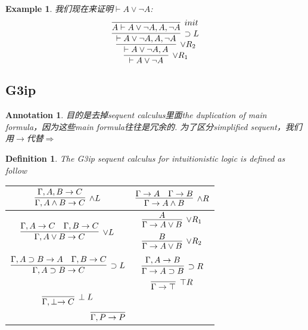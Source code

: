 \documentclass{article}
\theoremstyle{plain}
\newtheorem{example}[theorem]{Example}
\newtheorem{definition}[theorem]{Definition}
\newtheorem{annotation}[theorem]{Annotation}
\theoremstyle{nonumberplain}
\begin{document}
\begin{example}
\rm 我们现在来证明$\vdash A \vee \neg A$:
\[
	\infer[\vee R_1]{\vdash A \vee \neg A}{\infer[\vee R_2]{\vdash A \vee \neg A, A}{\infer[\supset L]{\vdash A \vee \neg A, A, \neg A}{\infer[init]{A \vdash A \vee \neg A, A, \neg A}{}}}}
\]
\end{example}

\newpage
\subsection{G3ip}

\begin{annotation}
\rm 目的是去掉sequent calculus里面the duplication of main formula，因为这些main formula往往是冗余的. 为了区分simplified sequent，我们用$\to$代替$\Rightarrow$
\end{annotation}

\begin{definition}
\rm \cite{15-317-rsc}The G3ip sequent calculus for intuitionistic logic is defined as follow
\begin{center}
\begin{tabular}{|c|c|}
\hline $\infer[\wedge L]{\Gamma, A \wedge B \to C}{\Gamma, A, B \to C}$  & $\infer[\wedge R]{\Gamma \to A \wedge B}{\Gamma \to A & \Gamma \to B}$ \rule{0em}{3em} \\
\hline $\infer[\vee L]{\Gamma, A \vee B \to C}{\Gamma, A \to C & \Gamma, B \to C}$ & $\begin{aligned}\infer[\vee R_1]{\Gamma \to A \vee B}{A} \\ \infer[\vee R_2]{\Gamma\to A \vee B}{B} \end{aligned}$ \rule{0em}{3em}\\
\hline $\infer[\supset L]{\Gamma, A \supset B \to C}{\Gamma, A \supset B \to A & \Gamma, B \to C}$ & $\infer[\supset R]{\Gamma \to A \supset B}{\Gamma, A \to B}$ \rule{0em}{3em} \\
\hline & $\infer[\top R]{\Gamma \to \top}{}$ \rule{0em}{2em}\\
\hline $\infer[\perp L]{\Gamma, \perp \to C}{}$ & \rule{0em}{2em}\\
\hline \multicolumn{2}{|c|}{$\infer[]{\Gamma,P \to P}{}$}\rule{0em}{2em}\\
\hline
\end{tabular}
\end{center}
\end{definition}
\end{document}
